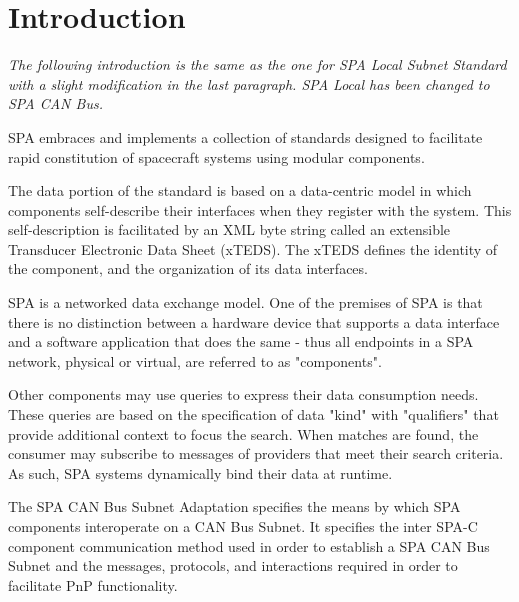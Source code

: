 \section{Introduction}
\textit{The following introduction is the same as the one for SPA Local Subnet Standard
\cite{standard:spa_local_adaptation} with a slight modification in the last
paragraph. SPA Local has been changed to SPA CAN Bus.}

SPA embraces and implements a collection of standards designed to facilitate
rapid constitution of spacecraft systems using modular components.

The data portion of the standard is based on a data-centric model in which
components self-describe their interfaces when they register with the system.
This self-description is facilitated by an XML byte string called an
extensible Transducer Electronic Data Sheet (xTEDS). The xTEDS defines the
identity of the component, and the organization of its data interfaces.

SPA is a networked data exchange model. One of the premises of SPA is that
there is no distinction between a hardware device that supports a data
interface and a software application that does the same - thus all endpoints
in a SPA network, physical or virtual, are referred to as "components".

Other components may use queries to express their data consumption needs.
These queries are based on the specification of data "kind" with "qualifiers"
that provide additional context to focus the search. When matches are found,
the consumer may subscribe to messages of providers that meet their search
criteria. As such, SPA systems dynamically bind their data at runtime.

The SPA CAN Bus Subnet Adaptation specifies the means by which SPA components
interoperate on a CAN Bus Subnet. It specifies the inter SPA-C component
communication method used in order to establish a SPA CAN Bus Subnet and the
messages, protocols, and interactions required in order to facilitate PnP
functionality.
